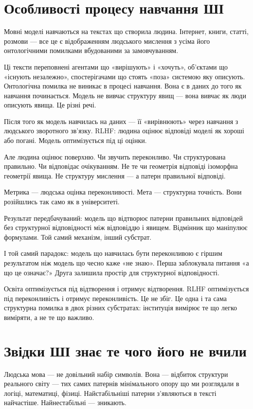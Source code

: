 \documentclass[12pt, a4paper, openany]{book}
\begin{document}
\section{Особливості процесу навчання ШІ}

Мовні моделі навчаються на текстах що створила людина. Інтернет, книги, статті, розмови --- все це є відображенням людського мислення з усіма його онтологічними помилками вбудованими за замовчуванням.

Ці тексти переповнені агентами що «вирішують» і «хочуть», об'єктами що «існують незалежно», спостерігачами що стоять «поза» системою яку описують. Онтологічна помилка не виникає в процесі навчання. Вона є в даних до того як навчання починається. Модель не вивчає структуру явищ --- вона вивчає як люди описують явища. Це різні речі.

Після того як модель навчилась на даних --- її «вирівнюють» через навчання з людського зворотного зв'язку. RLHF: людина оцінює відповіді моделі як хороші або погані. Модель оптимізується під ці оцінки.

Але людина оцінює поверхню. Чи звучить переконливо. Чи структурована правильно. Чи відповідає очікуванням. Не те чи геометрія відповіді ізоморфна геометрії явища. Не структуру мислення --- а патерн правильної відповіді.

Метрика --- людська оцінка переконливості. Мета --- структурна точність. Вони розійшлись так само як в університеті.

Результат передбачуваний: модель що відтворює патерни правильних відповідей без структурної відповідності між відповіддю і явищем. Відмінник що маніпулює формулами. Той самий механізм, інший субстрат.

І той самий парадокс: модель що навчилась бути переконливою є гіршим результатом ніж модель що чесно каже «не знаю». Перша заблокувала питання «а що це означає?» Друга залишила простір для структурної відповідності.

Освіта оптимізується під відтворення і отримує відтворення. RLHF оптимізується під переконливість і отримує переконливість. Це не збіг. Це одна і та сама структурна помилка в двох різних субстратах: інституція вимірює те що легко виміряти, а не те що важливо.

\section{Звідки ШІ знає те чого його не вчили}

Людська мова — не довільний набір символів. Вона — відбиток структури реального світу — тих самих патернів мінімального опору що ми розглядали в логіці, математиці, фізиці. Найстабільніші патерни з'являються в тексті найчастіше. Найнестабільні — зникають.
\end{document}
